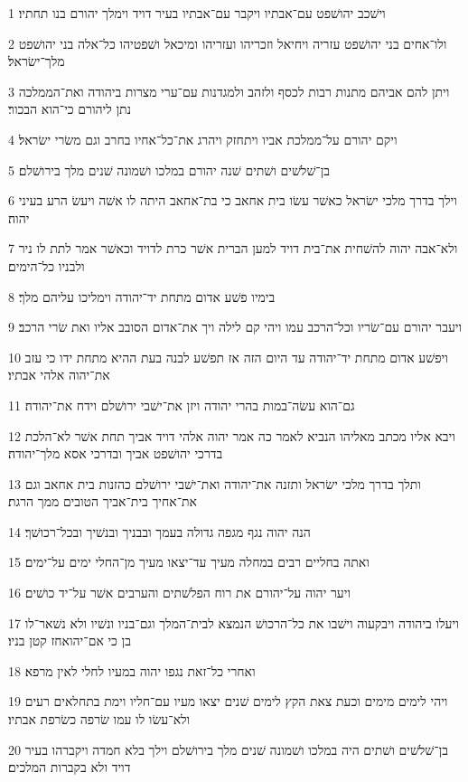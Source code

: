 \par 1 וישׁכב יהושׁפט עם־אבתיו ויקבר עם־אבתיו בעיר דויד וימלך יהורם בנו תחתיו׃
\par 2 ולו־אחים בני יהושׁפט עזריה ויחיאל וזכריהו ועזריהו ומיכאל ושׁפטיהו כל־אלה בני יהושׁפט מלך־ישׂראל׃
\par 3 ויתן להם אביהם מתנות רבות לכסף ולזהב ולמגדנות עם־ערי מצרות ביהודה ואת־הממלכה נתן ליהורם כי־הוא הבכור׃
\par 4 ויקם יהורם על־ממלכת אביו ויתחזק ויהרג את־כל־אחיו בחרב וגם משׂרי ישׂראל׃
\par 5 בן־שׁלשׁים ושׁתים שׁנה יהורם במלכו ושׁמונה שׁנים מלך בירושׁלם׃
\par 6 וילך בדרך מלכי ישׂראל כאשׁר עשׂו בית אחאב כי בת־אחאב היתה לו אשׁה ויעשׂ הרע בעיני יהוה׃
\par 7 ולא־אבה יהוה להשׁחית את־בית דויד למען הברית אשׁר כרת לדויד וכאשׁר אמר לתת לו ניר ולבניו כל־הימים׃
\par 8 בימיו פשׁע אדום מתחת יד־יהודה וימליכו עליהם מלך׃
\par 9 ויעבר יהורם עם־שׂריו וכל־הרכב עמו ויהי קם לילה ויך את־אדום הסובב אליו ואת שׂרי הרכב׃
\par 10 ויפשׁע אדום מתחת יד־יהודה עד היום הזה אז תפשׁע לבנה בעת ההיא מתחת ידו כי עזב את־יהוה אלהי אבתיו׃
\par 11 גם־הוא עשׂה־במות בהרי יהודה ויזן את־ישׁבי ירושׁלם וידח את־יהודה׃
\par 12 ויבא אליו מכתב מאליהו הנביא לאמר כה אמר יהוה אלהי דויד אביך תחת אשׁר לא־הלכת בדרכי יהושׁפט אביך ובדרכי אסא מלך־יהודה׃
\par 13 ותלך בדרך מלכי ישׂראל ותזנה את־יהודה ואת־ישׁבי ירושׁלם כהזנות בית אחאב וגם את־אחיך בית־אביך הטובים ממך הרגת׃
\par 14 הנה יהוה נגף מגפה גדולה בעמך ובבניך ובנשׁיך ובכל־רכושׁך׃
\par 15 ואתה בחליים רבים במחלה מעיך עד־יצאו מעיך מן־החלי ימים על־ימים׃
\par 16 ויער יהוה על־יהורם את רוח הפלשׁתים והערבים אשׁר על־יד כושׁים׃
\par 17 ויעלו ביהודה ויבקעוה וישׁבו את כל־הרכושׁ הנמצא לבית־המלך וגם־בניו ונשׁיו ולא נשׁאר־לו בן כי אם־יהואחז קטן בניו׃
\par 18 ואחרי כל־זאת נגפו יהוה במעיו לחלי לאין מרפא׃
\par 19 ויהי לימים מימים וכעת צאת הקץ לימים שׁנים יצאו מעיו עם־חליו וימת בתחלאים רעים ולא־עשׂו לו עמו שׂרפה כשׂרפת אבתיו׃
\par 20 בן־שׁלשׁים ושׁתים היה במלכו ושׁמונה שׁנים מלך בירושׁלם וילך בלא חמדה ויקברהו בעיר דויד ולא בקברות המלכים׃

